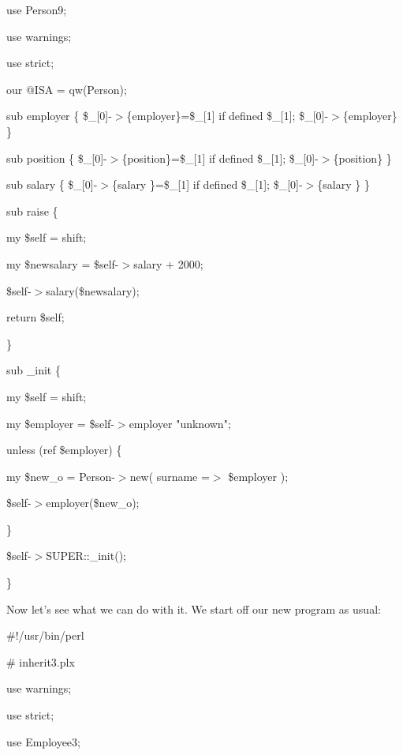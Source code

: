 \documentclass[a4paper,11pt]{book}
\begin{document}
\noindent use Person9;

\noindent use warnings;

\noindent use strict;

\noindent our @ISA = qw(Person);

\noindent sub employer \{ \$\_[0]-$>$\{employer\}=\$\_[1] if defined \$\_[1]; \$\_[0]-$>$\{employer\} \}

\noindent sub position \{ \$\_[0]-$>$\{position\}=\$\_[1] if defined \$\_[1]; \$\_[0]-$>$\{position\} \}

\noindent sub salary \{ \$\_[0]-$>$\{salary  \}=\$\_[1] if defined \$\_[1]; \$\_[0]-$>$\{salary  \} \}

\noindent 

\noindent sub raise \{

\noindent my \$self = shift;

\noindent my \$newsalary = \$self-$>$salary + 2000;

\noindent \$self-$>$salary(\$newsalary);

\noindent return \$self;

\noindent \}

\noindent 

\noindent sub \_init \{

\noindent my \$self = shift;

\noindent my \$employer = \$self-$>$employer \textbar \textbar  "unknown";

\noindent unless (ref \$employer) \{

\noindent my \$new\_o = Person-$>$new( surname =$>$ \$employer );

\noindent \$self-$>$employer(\$new\_o);

\noindent \}

\noindent \$self-$>$SUPER::\_init();

\noindent \}

\noindent 

\noindent 

\noindent Now let's see what we can do with it. We start off our new program as usual:

\noindent 

\noindent 

\noindent \#!/usr/bin/perl

\noindent \# inherit3.plx

\noindent use warnings;

\noindent use strict;

\noindent use Employee3;
\end{document}
